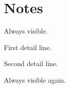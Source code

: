 \hypertarget{notes}{%
\section{Notes}\label{notes}}

Always visible.

First detail line.

Second detail line.

Always visible again.
